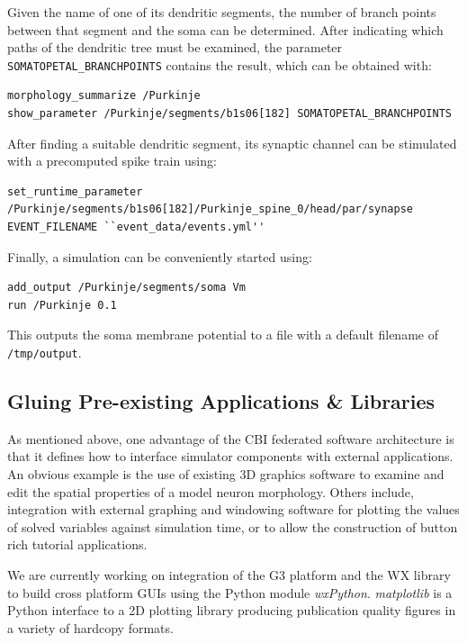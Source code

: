 \documentclass[12pt]{article}
\begin{document}
Given the name of one of its dendritic segments, the number of branch
points between that segment and the soma can be determined. After
indicating which paths of the dendritic tree must be examined, the
parameter {\tt SOMATOPETAL\_BRANCHPOINTS} contains the result, which
can be obtained with:

{\footnotesize
\begin{verbatim}
morphology_summarize /Purkinje
show_parameter /Purkinje/segments/b1s06[182] SOMATOPETAL_BRANCHPOINTS
\end{verbatim}
}

After finding a suitable dendritic segment, its synaptic channel can
be stimulated with a precomputed spike train using:

{\footnotesize
\begin{verbatim}
set_runtime_parameter /Purkinje/segments/b1s06[182]/Purkinje_spine_0/head/par/synapse EVENT_FILENAME ``event_data/events.yml''
\end{verbatim}

Finally, a simulation can be conveniently started using:

{\footnotesize
\begin{verbatim}
add_output /Purkinje/segments/soma Vm
run /Purkinje 0.1
\end{verbatim}
}

This outputs the soma membrane potential to a file with a default
filename of {\tt /tmp/output}.


\subsection{Gluing Pre-existing Applications \& Libraries}

As mentioned above, one advantage of the CBI federated software
architecture is that it defines how to interface simulator components
with external applications.  An obvious example is the use of existing
3D graphics software to examine and edit the spatial properties of a
model neuron morphology.  Others include, integration with external
graphing and windowing software for plotting the values of solved
variables against simulation time, or to allow the construction of
button rich tutorial applications.

We are currently working on integration of the G3 platform and the WX
library to build cross platform GUIs using the Python module {\it
  wxPython}.  {\it matplotlib} is a Python interface to a 2D plotting
library producing publication quality figures in a variety of hardcopy
formats.

}
\end{document}
